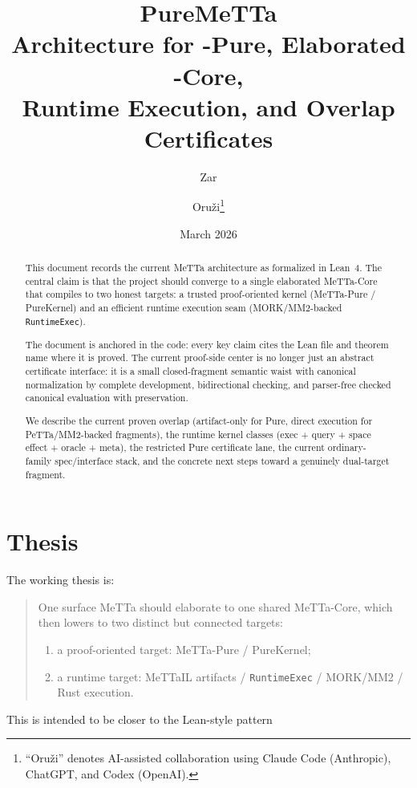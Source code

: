 \documentclass[11pt]{article}
\title{PureMeTTa\\
\large Architecture for \MeTTa-Pure, Elaborated \MeTTa-Core,\\
Runtime Execution, and Overlap Certificates}
\author{Zar \and Oru\v{z}i\footnote{``Oru\v{z}i'' denotes AI-assisted
collaboration using Claude Code (Anthropic), ChatGPT, and Codex (OpenAI).}}
\date{March 2026}
\theoremstyle{remark}
\newcommand{\MeTTa}{\textup{MeTTa}}
\newcommand{\MeTTaIL}{\textup{MeTTaIL}}
\newcommand{\MORK}{\textup{MORK}}
\newcommand{\PeTTa}{\textup{PeTTa}}
\newcommand{\code}[1]{\texttt{#1}}
\begin{document}
\maketitle

\begin{abstract}
This document records the current \MeTTa{} architecture as formalized in Lean~4.
The central claim is that the project should converge to a single elaborated
\MeTTa-Core that compiles to two honest targets: a trusted proof-oriented kernel
(\MeTTa-Pure / PureKernel) and an efficient runtime execution seam
(\MORK{}/MM2-backed \code{RuntimeExec}).

The document is anchored in the code: every key claim cites the Lean file and
theorem name where it is proved. The current proof-side center is no longer
just an abstract certificate interface: it is a small closed-fragment semantic
waist with canonical normalization by complete development, bidirectional
checking, and parser-free checked canonical evaluation with preservation.

We describe the current proven overlap (artifact-only for Pure, direct execution
for \PeTTa{}/MM2-backed fragments), the runtime kernel classes
(exec + query + space effect + oracle + meta), the restricted Pure certificate
lane, the current ordinary-family spec/interface stack, and the concrete next
steps toward a genuinely dual-target fragment.
\end{abstract}

\tableofcontents

\section{Thesis}
\label{sec:thesis}

The working thesis is:

\begin{quote}
One surface \MeTTa{} should elaborate to one shared \MeTTa-Core, which then
lowers to two distinct but connected targets:
\begin{enumerate}[nosep]
  \item a proof-oriented target: \MeTTa-Pure / PureKernel;
  \item a runtime target: \MeTTaIL{} artifacts / \code{RuntimeExec} /
  \MORK{}/MM2 / Rust execution.
\end{enumerate}
\end{quote}

This is intended to be closer to the Lean-style pattern
\end{document}

